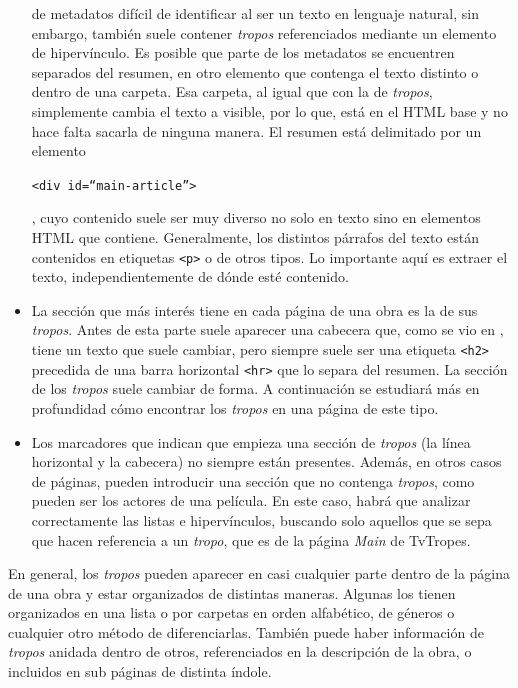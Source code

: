 \begin{itemize}
  de metadatos difícil de identificar al ser un texto en lenguaje natural, sin
  embargo, también suele contener \textit{tropos} referenciados mediante un
  elemento de hipervínculo. Es posible que parte de los metadatos se encuentren
  separados del resumen, en otro elemento que contenga el texto distinto o
  dentro de una carpeta. Esa carpeta, al igual que con la de \textit{tropos},
  simplemente cambia el texto a visible, por lo que, está en el HTML base y no
  hace falta sacarla de ninguna manera. El resumen está delimitado por un
  elemento \begin{otherlanguage}{english}\texttt{<div
  id=``main-article''>}\end{otherlanguage}, cuyo contenido suele ser muy diverso
  no solo en texto sino en elementos HTML que contiene. Generalmente, los
  distintos párrafos del texto están contenidos en etiquetas \texttt{<p>} o de
  otros tipos. Lo importante aquí es extraer el texto, independientemente de
  dónde esté contenido.
  \item La sección que más interés tiene en cada página de una obra es la de sus
  \textit{tropos}. Antes de esta parte suele aparecer una cabecera que, como se
  vio en \cite{nishalscraping}, tiene un texto que suele cambiar, pero siempre
  suele ser una etiqueta \texttt{<h2>} precedida de una barra horizontal
  \texttt{<hr>} que lo separa del resumen. La sección de los \textit{tropos}
  suele cambiar de forma. A continuación se estudiará más en profundidad cómo
  encontrar los \textit{tropos} en una página de este tipo.
  \item Los marcadores que indican que empieza una sección de \textit{tropos}
  (la línea horizontal y la cabecera) no siempre están presentes. Además, en
  otros casos de páginas, pueden introducir una sección que no contenga
  \textit{tropos}, como pueden ser los actores de una película. En este caso,
  habrá que analizar correctamente las listas e hipervínculos, buscando solo
  aquellos que se sepa que hacen referencia a un \textit{tropo}, que es de la
  página \textit{Main} de TvTropes.
\end{itemize}

En general, los \textit{tropos} pueden aparecer en casi cualquier parte dentro
de la página de una obra y estar organizados de distintas maneras. Algunas los
tienen organizados en una lista o por carpetas en orden alfabético, de géneros o
cualquier otro método de diferenciarlas. También puede haber información de
\textit{tropos} anidada dentro de otros, referenciados en la descripción de la
obra, o incluidos en sub páginas de distinta índole.


